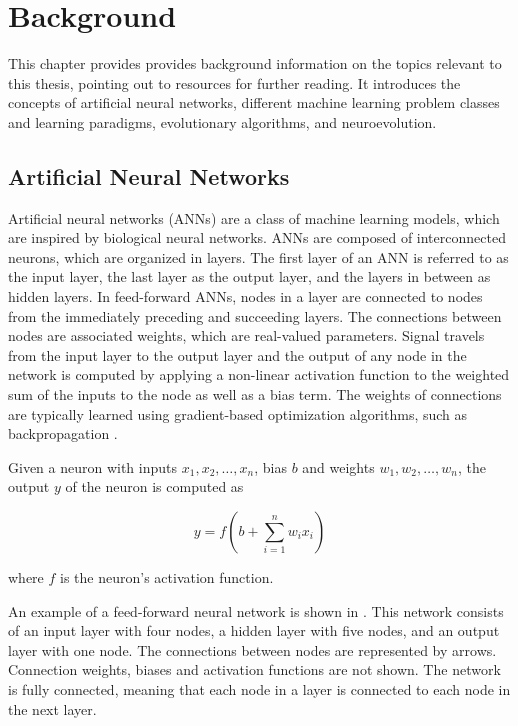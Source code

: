 \chapter{Background}
\label{chap:background}

This chapter provides provides background information on the topics relevant to this thesis, pointing out to resources for further reading.
It introduces the concepts of artificial neural networks, different machine learning problem classes and learning paradigms, evolutionary algorithms, and neuroevolution.

\section{Artificial Neural Networks}

Artificial neural networks (ANNs) are a class of machine learning models, which are inspired by biological neural networks. ANNs are composed of interconnected
neurons, which are organized in layers. The first layer of an ANN is referred to as the input layer, the last layer as the output layer, and the layers
in between as hidden layers. In feed-forward ANNs, nodes in a layer are connected to nodes from the immediately preceding and succeeding layers. The connections between nodes
are associated weights, which are real-valued parameters.
Signal travels from the input layer to the output layer and the output of any node in the network is computed by applying a non-linear activation function
to the weighted sum of the inputs to the node as well as a bias term.
The weights of connections are typically learned using gradient-based optimization algorithms, such as backpropagation \cite{backpropagation}.

Given a neuron with inputs $x_1, x_2, \ldots, x_n$, bias $b$ and weights $w_1, w_2, \ldots, w_n$, the output $y$ of the neuron is computed as

\[
    y = f(b + \sum_{i=1}^{n} w_i x_i)
\]

where $f$ is the neuron's activation function.

An example of a feed-forward neural network is shown in . This network consists of an input layer with four nodes, a hidden layer with five nodes,
and an output layer with one node. The connections between nodes are represented by arrows. Connection weights, biases and activation functions are
not shown. The network is fully connected, meaning that each node in a layer is connected to each node in the next layer.

